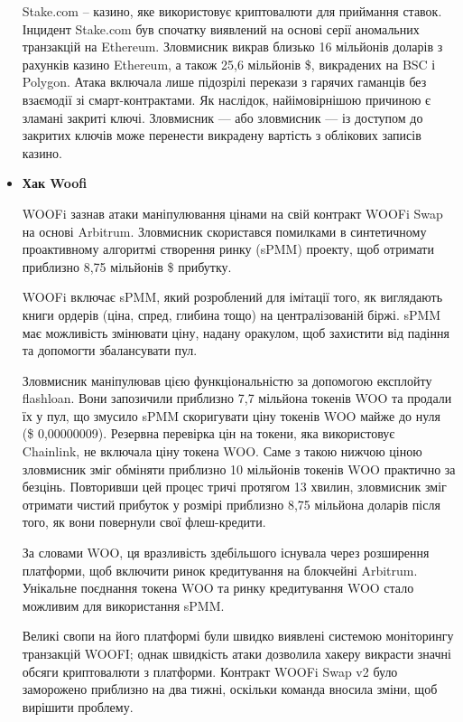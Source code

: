 \begin{itemize}
        Stake.com -- казино, яке використовує криптовалюти для приймання ставок. Інцидент Stake.com був спочатку виявлений на основі серії аномальних транзакцій на Ethereum. Зловмисник викрав близько 16 мільйонів доларів з рахунків казино Ethereum, а також 25,6 мільйонів \$, викрадених на BSC і Polygon. Атака включала лише підозрілі перекази з гарячих гаманців без взаємодії зі смарт-контрактами. Як наслідок, найімовірнішою причиною є зламані закриті ключі. Зловмисник — або зловмисник — із доступом до закритих ключів може перенести викрадену вартість з облікових записів казино.

    \item \textbf{Хак Woofi}

        WOOFi зазнав атаки маніпулювання цінами на свій контракт WOOFi Swap на основі Arbitrum. Зловмисник скористався помилками в синтетичному проактивному алгоритмі створення ринку (sPMM) проекту, щоб отримати приблизно 8,75 мільйонів \$ прибутку.

        WOOFi включає sPMM, який розроблений для імітації того, як виглядають книги ордерів (ціна, спред, глибина тощо) на централізованій біржі. sPMM має можливість змінювати ціну, надану оракулом, щоб захистити від падіння та допомогти збалансувати пул. 
        
        Зловмисник маніпулював цією функціональністю за допомогою експлойту flashloan. Вони запозичили приблизно 7,7 мільйона токенів WOO та продали їх у пул, що змусило sPMM скоригувати ціну токенів WOO майже до нуля (\$ 0,00000009). Резервна перевірка цін на токени, яка використовує Chainlink, не включала ціну токена WOO. Саме з такою нижчою ціною зловмисник зміг обміняти приблизно 10 мільйонів токенів WOO практично за безцінь. Повторивши цей процес тричі протягом 13 хвилин, зловмисник зміг отримати чистий прибуток у розмірі приблизно 8,75 мільйона доларів після того, як вони повернули свої флеш-кредити.
        
        За словами WOO, ця вразливість здебільшого існувала через розширення платформи, щоб включити ринок кредитування на блокчейні Arbitrum. Унікальне поєднання токена WOO та ринку кредитування WOO стало можливим для використання sPMM.
        
        Великі свопи на його платформі були швидко виявлені системою моніторингу транзакцій WOOFI; однак швидкість атаки дозволила хакеру викрасти значні обсяги криптовалюти з платформи. Контракт WOOFi Swap v2 було заморожено приблизно на два тижні, оскільки команда вносила зміни, щоб вирішити проблему.
\end{itemize}

